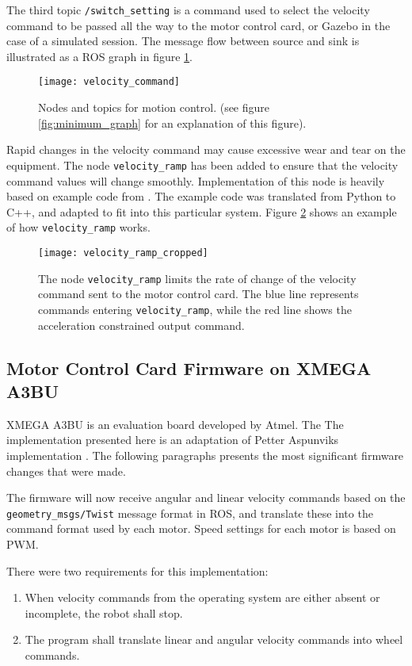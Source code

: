 The third topic \texttt{/switch\_setting} is a command used to select the velocity command to be passed all the way to the motor control card, or Gazebo in the case of a simulated session. The message flow between source and sink is illustrated as a \ac{ROS} graph in figure \ref{fig:move_base_nodes}.

\begin{figure}[h]
	\centering
	\texttt{[image: velocity\_command]}
	\caption{Nodes and topics for motion control. (see figure \ref{fig:minimum_graph} for an explanation of this figure).}
	\label{fig:move_base_nodes}
\end{figure}

Rapid changes in the velocity command may cause excessive wear and tear on the equipment. The node \texttt{velocity\_ramp} has been added to ensure that the velocity command values will change smoothly. Implementation of this node is heavily based on example code from \cite{rosbook15}. The example code was translated from Python to C++, and adapted to fit into this particular system. Figure \ref{fig:velocity_ramp} shows an example of how \texttt{velocity\_ramp} works.

\begin{figure}[h]
	\centering
	\texttt{[image: velocity\_ramp\_cropped]}
	\caption{The node \texttt{velocity\_ramp} limits the rate of change of the velocity command sent to the motor control card. The blue line represents commands entering \texttt{velocity\_ramp}, while the red line shows the acceleration constrained output command.}
	\label{fig:velocity_ramp}
\end{figure}


\subsection{Motor Control Card Firmware on XMEGA A3BU}

XMEGA A3BU is an evaluation board developed by Atmel. The The implementation presented here is an adaptation of Petter Aspunviks implementation \cite{aspunvik}. The following paragraphs presents the most significant firmware changes that were made.

The firmware will now receive angular and linear velocity commands based on the \texttt{geometry\_msgs/Twist} message format in \ac{ROS}, and translate these into the command format used by each motor. Speed settings for each motor is based on \ac{PWM}. 

There were two requirements for this implementation: 
\begin{enumerate}
\item When velocity commands from the operating system are either absent or incomplete, the robot shall stop.
\item The program shall translate linear and angular velocity commands into wheel commands.
\end{enumerate}

